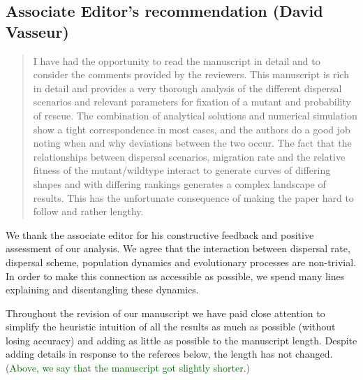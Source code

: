 \documentclass[11pt]{article}
\newenvironment{referee}{\vspace{0.cm} \sffamily \color{colreferee} \begin{quotation} }{\end{quotation} \vspace{0.cm}}
\newcommand{\lmarginpar}[1]{\reversemarginpar\marginpar{\textcolor{colreferee}{\textbf{\textsf{[#1]}}}}}
\newcommand{\addnb}[1]{\refstepcounter{numcom}\lmarginpar{\arabic{numcom}}\label{#1}}
\newcommand{\refsec}[1]{{\textcolor{colreferee}{\section*{#1}}}}
\newcommand{\hildegard}[1]{\textcolor{darkgreen}{(#1)}}
\newcounter{numcom}
\begin{document}
\newpage
\refsec{Associate Editor's recommendation (David Vasseur)}

\begin{referee}
I \addnb{AE}have had the opportunity to read the manuscript in detail and to consider the comments provided by the reviewers. This manuscript is rich in detail and provides a very thorough analysis of the different dispersal scenarios and relevant parameters for fixation of a mutant and probability of rescue.   The combination of analytical solutions and numerical simulation show a tight correspondence in most cases, and the authors do a good job noting when and why deviations between the two occur. The fact that the relationships between dispersal scenarios, migration rate and the relative fitness of the mutant/wildtype interact to generate curves of differing shapes and with differing rankings generates a complex landscape of results. This has the unfortunate consequence of making the paper hard to follow and rather lengthy.
\end{referee}
%
We thank the associate editor for his constructive feedback and positive assessment of our analysis. We agree that the interaction between dispersal rate, dispersal scheme, population dynamics and evolutionary processes are non-trivial. In order to make this connection as accessible as possible, we spend many lines explaining and disentangling these dynamics.

Throughout the revision of our manuscript we have paid close attention to simplify the heuristic intuition of all the results as much as possible (without losing accuracy) and adding as little as possible to the manuscript length. Despite adding details in response to the referees below, the length has not changed.\hildegard{Above, we say that the manuscript got slightly shorter.}
\end{document}
